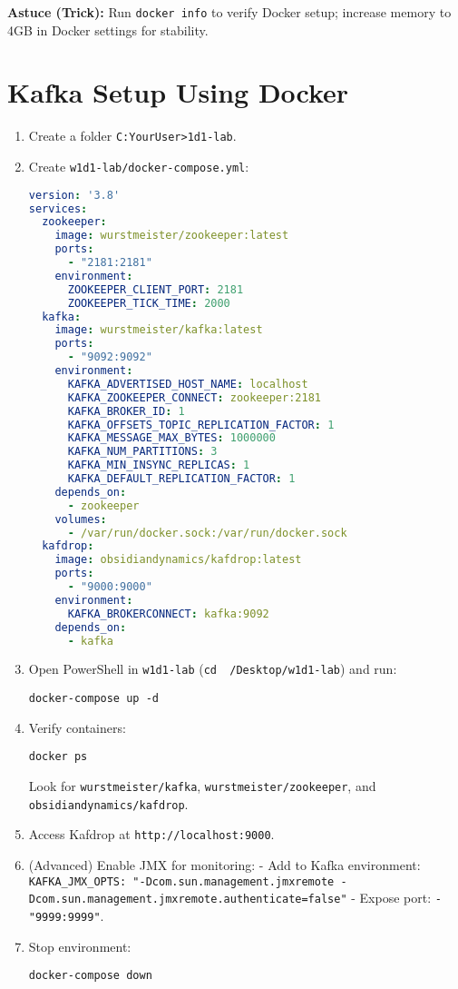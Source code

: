 \documentclass[12pt,a4paper]{report}
\begin{document}
\begin{framed}
\textbf{Astuce (Trick):} Run \texttt{docker info} to verify Docker setup; increase memory to 4GB in Docker settings for stability.
\end{framed}

\section{Kafka Setup Using Docker}
\begin{enumerate}
    \item Create a folder \texttt{C:\Users\<YourUser>\Desktop\w1d1-lab}.
    \item Create \texttt{w1d1-lab/docker-compose.yml}:
\begin{lstlisting}[language=yaml]
version: '3.8'
services:
  zookeeper:
    image: wurstmeister/zookeeper:latest
    ports:
      - "2181:2181"
    environment:
      ZOOKEEPER_CLIENT_PORT: 2181
      ZOOKEEPER_TICK_TIME: 2000
  kafka:
    image: wurstmeister/kafka:latest
    ports:
      - "9092:9092"
    environment:
      KAFKA_ADVERTISED_HOST_NAME: localhost
      KAFKA_ZOOKEEPER_CONNECT: zookeeper:2181
      KAFKA_BROKER_ID: 1
      KAFKA_OFFSETS_TOPIC_REPLICATION_FACTOR: 1
      KAFKA_MESSAGE_MAX_BYTES: 1000000
      KAFKA_NUM_PARTITIONS: 3
      KAFKA_MIN_INSYNC_REPLICAS: 1
      KAFKA_DEFAULT_REPLICATION_FACTOR: 1
    depends_on:
      - zookeeper
    volumes:
      - /var/run/docker.sock:/var/run/docker.sock
  kafdrop:
    image: obsidiandynamics/kafdrop:latest
    ports:
      - "9000:9000"
    environment:
      KAFKA_BROKERCONNECT: kafka:9092
    depends_on:
      - kafka
\end{lstlisting}
    \item Open PowerShell in \texttt{w1d1-lab} (\texttt{cd ~/Desktop/w1d1-lab}) and run:
    \begin{lstlisting}
docker-compose up -d
    \end{lstlisting}
    \item Verify containers:
    \begin{lstlisting}
docker ps
    \end{lstlisting}
    Look for \texttt{wurstmeister/kafka}, \texttt{wurstmeister/zookeeper}, and \texttt{obsidiandynamics/kafdrop}.
    \item Access Kafdrop at \texttt{http://localhost:9000}.
    \item (Advanced) Enable JMX for monitoring:
       - Add to Kafka environment: \texttt{KAFKA_JMX_OPTS: "-Dcom.sun.management.jmxremote -Dcom.sun.management.jmxremote.authenticate=false"}
       - Expose port: \texttt{- "9999:9999"}.
    \item Stop environment:
    \begin{lstlisting}
docker-compose down
    \end{lstlisting}
\end{enumerate}
\end{document}
